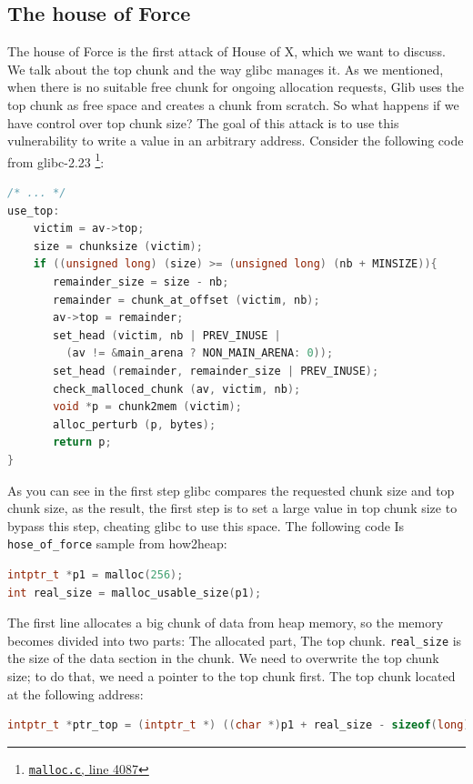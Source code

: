 \documentclass{masterthesis}
\newcommand*\libc{glibc}
\begin{document}
\subsection{The house of Force}
The house of Force is the first attack of House of X, which we want to discuss. We talk about the top chunk and the way \libc{} manages it. As we mentioned, when there is no suitable free chunk for ongoing allocation requests, Glib uses the top chunk as free space and creates a chunk from scratch. So what happens if we have control over top chunk size? The goal of this attack is to use this vulnerability to write a value in an arbitrary address. Consider the following code from \libc{-2.23} \footnote{\href{https://sourceware.org/git/?p=glibc.git;a=blob;f=malloc/malloc.c;h=f7cd29bc2f93e1082ee77800bd64a4b2a2897055;hb=9ea3686266dca3f004ba874745a4087a89682617\#l4087}{\texttt{malloc.c}, line 4087}}:
\begin{lstlisting}[language=c,frame=tlrb]
 /* ... */
use_top:
	victim = av->top;
	size = chunksize (victim);
	if ((unsigned long) (size) >= (unsigned long) (nb + MINSIZE)){
	   remainder_size = size - nb;
	   remainder = chunk_at_offset (victim, nb);
	   av->top = remainder;
	   set_head (victim, nb | PREV_INUSE |
	     (av != &main_arena ? NON_MAIN_ARENA: 0));
	   set_head (remainder, remainder_size | PREV_INUSE);
	   check_malloced_chunk (av, victim, nb);
	   void *p = chunk2mem (victim);
	   alloc_perturb (p, bytes);
	   return p;
}
\end{lstlisting}
As you can see in the first step \libc{} compares the requested chunk size and top chunk size, as the result, the first step is to set a large value in top chunk size to bypass this step, cheating \libc{} to use this space. The following code Is \lstinline{hose_of_force} sample from how2heap:

\begin{lstlisting}[language=c,frame=tlrb]
intptr_t *p1 = malloc(256);
int real_size = malloc_usable_size(p1);
\end{lstlisting}

The first line allocates a big chunk of data from heap memory, so the memory becomes divided into two parts: The allocated part, The top chunk. \lstinline{real_size} is the size of the data section in the chunk. We need to overwrite the top chunk size; to do that, we need a pointer to the top chunk first. The top chunk located at the following address:

\begin{lstlisting}[language=c,frame=tlrb]
intptr_t *ptr_top = (intptr_t *) ((char *)p1 + real_size - sizeof(long));
\end{lstlisting}
\end{document}
